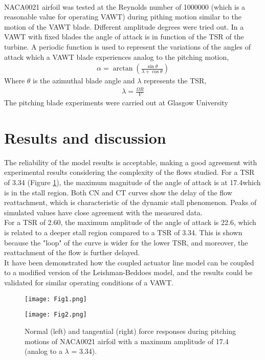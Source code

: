 \documentclass[a4paper]{jpconf}
\begin{document}
\\
NACA0021 airfoil was tested at the Reynolds number of 1000000 (which is a reasonable value for operating VAWT) during pithing motion similar to the motion of the VAWT blade. Different amplitude degrees were tried out. In a VAWT with fixed blades the angle of attack is in function of the TSR of the turbine. A periodic function is used to represent the variations of the angles of attack which a VAWT blade experiences analog to the pitching motion,
\begin{eqnarray}
\alpha = \arctan \left( \frac{\sin \theta}{\lambda + \cos \theta} \right)
\end{eqnarray}
Where $\theta$ is the azimuthal blade angle and $ \lambda $ represents the TSR,
\begin{eqnarray}
\lambda =  \frac{\Omega R}{V}
\end{eqnarray}
The pitching blade experiments were carried out at Glasgow University\cite{angell1988collected}\\

\section{Results and discussion}
The reliability of the model results is acceptable, making a good agreement with experimental results considering the complexity of the flows studied. For a TSR of 3.34 (Figure \ref{fig1}), the maximum magnitude of the angle of attack is at 17.4\degree which is in the stall region. Both CN and CT curves show the delay of the flow reattachment, which is characteristic of the dynamic stall phenomenon. Peaks of simulated values have close agreement with the measured data.\\
For a TSR of 2.60, the maximum amplitude of the angle of attack is 22.6, which is related to a deeper stall region compared to a TSR of 3.34. This is shown because the "loop" of the curve is wider for the lower TSR, and moreover, the reattachment of the flow is further delayed.\\
It have been demonstrated how the coupled actuator line model can be coupled to a modified version of the Leishman-Beddoes model, and the results could be validated for similar operating conditions of a VAWT.



\begin{figure}[h]
\begin{minipage}{18pc}
\texttt{[image: Fig1.png]}
\end{minipage}\hspace{2pc}%
\begin{minipage}{18pc}
\texttt{[image: Fig2.png]}
\end{minipage}
\caption{\label{fig1}Normal (left) and tangential (right) force responses during pitching motions of NACA0021 airfoil with a maximum amplitude of 17.4 \degree (analog to a $\lambda$ = 3.34).}
\end{figure}
\end{document}
